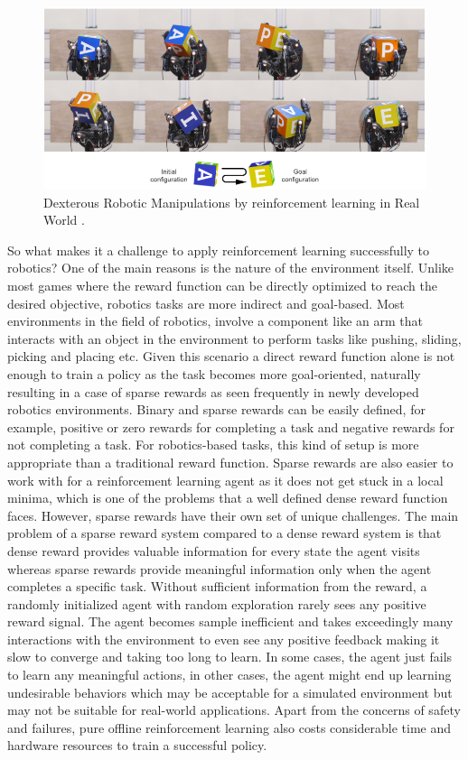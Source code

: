 \begin{figure}[h!]
    \centering
    \includegraphics[width=\textwidth]{images/RRL.png}
    \caption{Dexterous Robotic Manipulations by reinforcement learning in Real World \cite{openai2019learning}.}
    \label{fig:RRL}
\end{figure}

So what makes it a challenge to apply reinforcement learning successfully to robotics? One of the main reasons is the nature of the environment itself. Unlike most games where the reward function can be directly optimized to reach the desired objective, robotics tasks are more indirect and goal-based. Most environments in the field of robotics, involve a component like an arm that interacts with an object in the environment to perform tasks like pushing, sliding, picking and placing etc. Given this scenario a direct reward function alone is not enough to train a policy as the task becomes more goal-oriented, naturally resulting in a case of sparse rewards as seen frequently in newly developed robotics environments. Binary and sparse rewards can be easily defined, for example, positive or zero rewards for completing a task and negative rewards for not completing a task. For robotics-based tasks, this kind of setup is more appropriate than a traditional reward function. Sparse rewards are also easier to work with for a reinforcement learning agent as it does not get stuck in a local minima, which is one of the problems that a well defined dense reward function faces. However, sparse rewards have their own set of unique challenges. The main problem of a sparse reward system compared to a dense reward system is that dense reward provides valuable information for every state the agent visits whereas sparse rewards provide meaningful information only when the agent completes a specific task. Without sufficient information from the reward, a randomly initialized agent with random exploration rarely sees any positive reward signal. The agent becomes sample inefficient and takes exceedingly many interactions with the environment to even see any positive feedback making it slow to converge and taking too long to learn. In some cases, the agent just fails to learn any meaningful actions, in other cases, the agent might end up learning undesirable behaviors which may be acceptable for a simulated environment but may not be suitable for real-world applications. Apart from the concerns of safety and failures, pure offline reinforcement learning also costs considerable time and hardware resources to train a successful policy. \\

